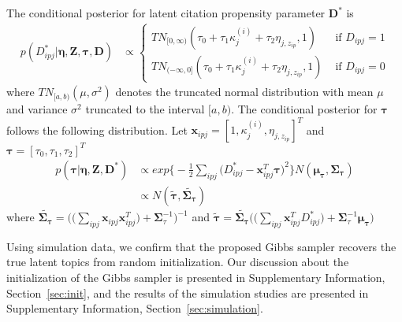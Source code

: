 The conditional posterior for latent citation propensity parameter $\textbf{D}^*$ is 
{ \footnotesize
\begin{align}
    p(D^*_{ipj}|\pmb\eta,\mathbf{Z},\pmb\tau, \mathbf{D}) &\propto \begin{cases} TN_{[0,\infty)}(\tau_0+\tau_1\kappa_j^{(i)}+\tau_2\eta_{j,z_{ip}},1) & \text{ if } D_{ipj} = 1 \\
    TN_{(-\infty,0]}(\tau_0+\tau_1\kappa_j^{(i)}+\tau_2\eta_{j,z_{ip}},1) & \text{ if } D_{ipj} = 0
    \end{cases}
\end{align}
}
\noindent where $TN_{[a,b)}(\mu,\sigma^2)$ denotes the truncated normal distribution with mean $\mu$ and variance $\sigma^2$ truncated to the interval $[a,b)$.
The conditional posterior for $\pmb\tau$ follows the following distribution. Let $\mathbf{x}_{ipj} = [1,\kappa_j^{(i)},\eta_{j,z_{ip}}]^T$ and $\pmb\tau = [\tau_0,\tau_1,\tau_2]^T$
\begin{align}
    p(\pmb\tau|\pmb\eta,\mathbf{Z},\mathbf{D}^*) &\propto exp\Bigg\{-\frac{1}{2} \sum_{ipj}\Big(D_{ipj}^* - \mathbf{x}_{ipj}^T\pmb\tau \Big)^2 \Bigg\} N(\pmb\mu_{\pmb\tau},\pmb\Sigma_{\pmb\tau})\nonumber \\
    &\propto N(\tilde{\pmb\tau},\tilde{\pmb\Sigma_{\pmb\tau}})
\end{align}
\noindent where $\tilde{\pmb\Sigma_{\pmb\tau}} = \Bigg(\Big(\sum_{ipj}\mathbf{x}_{ipj}\mathbf{x}_{ipj}^T \Big) + \pmb\Sigma_{\tau}^{-1} \Bigg)^{-1}$ 
and $\tilde{\pmb\tau} = \tilde{\pmb\Sigma_{\pmb\tau}}\Bigg(\Big(\sum_{ipj}\mathbf{x}_{ipj}^TD_{ipj}^*\Big) + \pmb\Sigma_{\tau}^{-1}\pmb\mu_{\pmb\tau}\Bigg)$

Using simulation data, we confirm that the proposed Gibbs sampler recovers the true latent topics from random initialization.
Our discussion about the initialization of the Gibbs sampler is presented in Supplementary Information, Section~\ref{sec:init}, and the results of the simulation studies are presented in Supplementary Information, Section~\ref{sec:simulation}.

